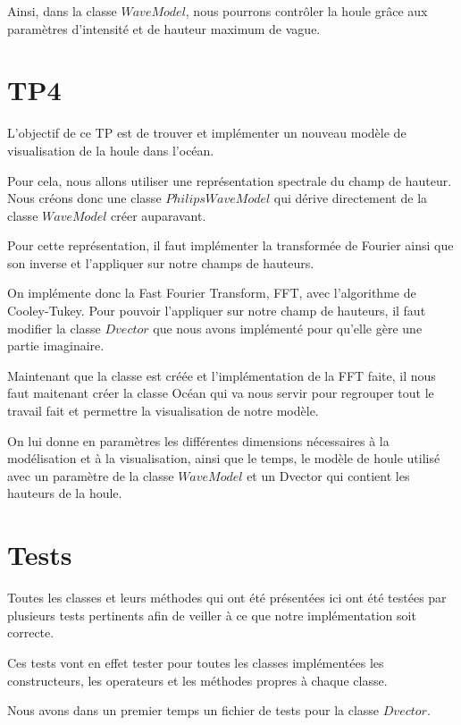 \documentclass{article}
\begin{document}
Ainsi, dans la classe $WaveModel$, nous pourrons contrôler la houle grâce aux paramètres d'intensité et de hauteur maximum de vague.

\vspace{1cm}

\section{TP4}

L'objectif de ce TP est de trouver et implémenter un nouveau modèle de visualisation de la houle dans l'océan.

Pour cela, nous allons utiliser une représentation spectrale du champ de hauteur. Nous créons donc une classe $PhilipsWaveModel$ qui dérive directement de la classe $WaveModel$ créer auparavant.

Pour cette représentation, il faut implémenter la transformée de Fourier ainsi que son inverse et l'appliquer sur notre champs de hauteurs.

On implémente donc la Fast Fourier Transform, FFT, avec l'algorithme de Cooley-Tukey. Pour pouvoir l'appliquer sur notre champ de hauteurs, il faut modifier la classe $Dvector$ que nous avons implémenté pour qu'elle gère une partie imaginaire.


Maintenant que la classe est créée et l'implémentation de la FFT faite, il nous faut maitenant créer la classe Océan qui va nous servir pour regrouper tout le travail fait et permettre la visualisation de notre modèle.

On lui donne en paramètres les différentes dimensions nécessaires à la modélisation et à la visualisation, ainsi que le temps, le modèle de houle utilisé avec un paramètre de la classe $WaveModel$ et un Dvector qui contient les hauteurs de la houle.

\vspace{1cm}

\section{Tests}

Toutes les classes et leurs méthodes qui ont été présentées ici ont été testées par plusieurs tests pertinents afin de veiller à ce que notre implémentation soit correcte.

Ces tests vont en effet tester pour toutes les classes implémentées les constructeurs, les operateurs et les méthodes propres à chaque classe.

Nous avons dans un premier temps un fichier de tests pour la classe $Dvector$.
\end{document}
